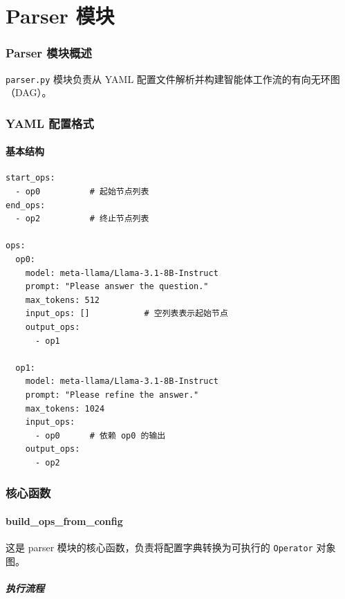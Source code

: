 \documentclass[12pt,a4paper]{article}
\begin{document}
\part{Parser 模块}

\section{Parser 模块概述}

\texttt{parser.py} 模块负责从 YAML 配置文件解析并构建智能体工作流的有向无环图（DAG）。

\section{YAML 配置格式}

\subsection{基本结构}

\begin{lstlisting}
start_ops:
  - op0          # 起始节点列表
end_ops:
  - op2          # 终止节点列表

ops:
  op0:
    model: meta-llama/Llama-3.1-8B-Instruct
    prompt: "Please answer the question."
    max_tokens: 512
    input_ops: []           # 空列表表示起始节点
    output_ops:
      - op1
    
  op1:
    model: meta-llama/Llama-3.1-8B-Instruct
    prompt: "Please refine the answer."
    max_tokens: 1024
    input_ops:
      - op0      # 依赖 op0 的输出
    output_ops:
      - op2
\end{lstlisting}

\section{核心函数}

\subsection{build\_ops\_from\_config}

这是 parser 模块的核心函数，负责将配置字典转换为可执行的 \texttt{Operator} 对象图。

\subsubsection{执行流程}
\end{document}

